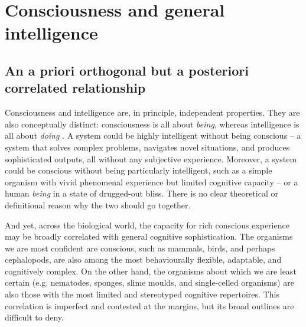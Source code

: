 \documentclass[11pt, a4paper, onecolumn, gdm]{google}
\begin{document}
\section{Consciousness and general intelligence}\label{consciousness-and-general-intelligence}

\subsection{An a priori orthogonal but a posteriori correlated relationship}\label{an-a-priori-orthogonal-but-a-posteriori-correlated-relationship}

Consciousness and intelligence are, in principle, independent properties. They are also conceptually distinct: consciousness is all about \emph{being}, whereas intelligence is all about \emph{doing} \citep[see, e.g.,][]{seth2024,tononi2016}.
A system could be highly intelligent without being conscious -- a system that solves complex problems, navigates novel situations, and produces sophisticated outputs, all without any subjective experience.
Moreover, a system could be conscious without being particularly intelligent, such as a simple organism with vivid phenomenal experience but limited cognitive capacity -- or a human \emph{being} in a state of drugged-out bliss.
There is no clear theoretical or definitional reason why the two should go together.

And yet, across the biological world, the capacity for rich conscious experience may be broadly correlated with general cognitive sophistication.
The organisms we are most confident are conscious, such as mammals, birds, and perhaps cephalopods, are also among the most behaviourally flexible, adaptable, and cognitively complex.
On the other hand, the organisms about which we are least certain (e.g. nematodes, sponges, slime moulds, and single-celled organisms) are also those with the most limited and stereotyped cognitive repertoires.
This correlation is imperfect and contested at the margins, but its broad outlines are difficult to deny.
\end{document}
